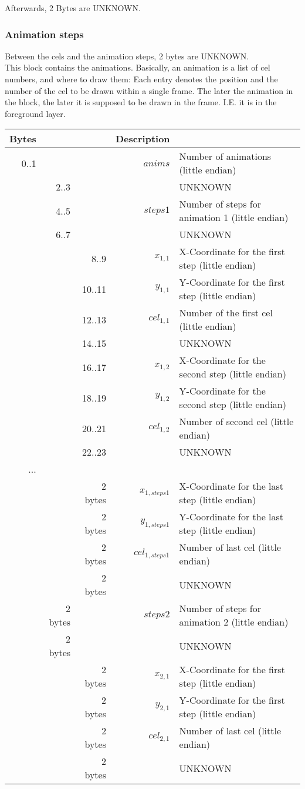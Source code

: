 \documentclass[11pt,twoside,openright]{report}
\begin{document}
Afterwards, 2 Bytes are UNKNOWN.

\subsubsection{Animation steps}

Between the cels and the animation steps, 2 bytes are UNKNOWN.\\

This block contains the animations. Basically, an animation is a list of cel numbers, and where to draw them: Each entry denotes the position and the number of the cel to be drawn within a single frame. The later the animation in the block, the later it is supposed to be drawn in the frame. I.E. it is in the foreground layer.\\

\begin{tabular}{rrr|rl}
Bytes&&&Description\\\hline
0..1&&&$anims$&Number of animations (little endian)\\\hline
&2..3&&&UNKNOWN\\
&4..5&&$steps1$&Number of steps for animation 1 (little endian)\\
&6..7&&&UNKNOWN\\
&&8..9&$x_{1,1}$&X-Coordinate for the first step (little endian)\\
&&10..11&$y_{1,1}$&Y-Coordinate for the first step (little endian)\\
&&12..13&$cel_{1,1}$&Number of the first cel (little endian)\\
&&14..15&&UNKNOWN\\\hline
&&16..17&$x_{1,2}$&X-Coordinate for the second step (little endian)\\
&&18..19&$y_{1,2}$&Y-Coordinate for the second step (little endian)\\
&&20..21&$cel_{1,2}$&Number of second cel (little endian)\\
&&22..23&&UNKNOWN\\\hline
...&&\\
&&2 bytes&$x_{1,steps1}$&X-Coordinate for the last step (little endian)\\
&&2 bytes&$y_{1,steps1}$&Y-Coordinate for the last step (little endian)\\
&&2 bytes&$cel_{1,steps1}$&Number of last cel (little endian)\\
&&2 bytes&&UNKNOWN\\\hline
&2 bytes&&$steps2$&Number of steps for animation 2 (little endian)\\
&2 bytes&&&UNKNOWN\\\hline
&&2 bytes&$x_{2,1}$&X-Coordinate for the first step (little endian)\\
&&2 bytes&$y_{2,1}$&Y-Coordinate for the first step (little endian)\\
&&2 bytes&$cel_{2,1}$&Number of last cel (little endian)\\
&&2 bytes&&UNKNOWN\\\hline
\end{tabular}
\end{document}
